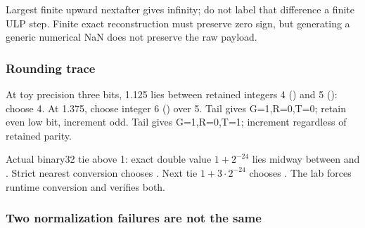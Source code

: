 Largest finite upward nextafter gives infinity; do not label that difference a finite ULP step. Finite exact reconstruction must preserve zero sign, but generating a generic numerical NaN does not preserve the raw payload.

\subsubsection{Rounding trace}\label{appendix-92ff77d4dfdc-rounding-trace}

\hypertarget{appendix-92ff77d4dfdc-rounding-trace}{}

At toy precision three bits, 1.125 lies between retained integers 4 () and 5 (): choose 4. At 1.375, choose integer 6 () over 5. Tail  gives G=1,R=0,T=0; retain even low bit, increment odd. Tail  gives G=1,R=0,T=1; increment regardless of retained parity.

Actual binary32 tie above 1: exact double value \(1+2^{-24}\) lies midway between  and . Strict nearest conversion chooses . Next tie \(1+3\cdot2^{-24}\) chooses . The lab forces runtime conversion and verifies both.

\subsubsection{Two normalization failures are not the same}\label{appendix-92ff77d4dfdc-two-normalization-failures-are-not-the-same}

\hypertarget{appendix-92ff77d4dfdc-two-normalization-failures-are-not-the-same}{}

